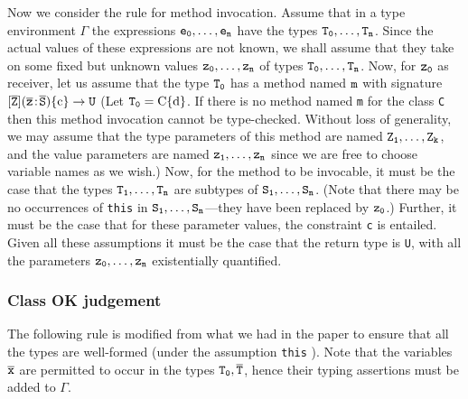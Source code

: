 \documentclass[preprint,nocopyrightspace,9pt]{sigplanconf}
\begin{document}
Now we consider the rule for method invocation. Assume that in a type
environment $\Gamma$ the expressions ${\tt e_0}, \dots, {\tt e_n}$
have the types ${\tt T_0}, \dots, {\tt T_n}$.
Since the
actual values of these expressions are not known, we shall assume that
they take on some fixed but unknown values
                                     ${\tt z_0}, \dots, {\tt z_n}$
of types ${\tt T_0}, \dots, {\tt T_n}$.
Now, for ${\tt z_0}$ as receiver, let us assume that the type
${\tt T_0}$ has a method named ${\tt m}$
with signature
$[\bar{\tt Z}](\bar{\tt z} \ty \bar{\tt S})\Xcd{\{c\}} \to {\tt U}$
(Let ${\tt T_0} = \Xcd{C\{d\}}$.
 If there is no
method named {\tt m} for the class {\tt C} then this method invocation cannot be
type-checked. Without loss of generality, we may assume that the
type parameters of this method are named
                                     ${\tt Z_1}, \dots, {\tt Z_k}$, and
the value parameters are named
                                     ${\tt z_1}, \dots, {\tt z_n}$
since we are free to choose
variable names as we wish.)
Now, for the method to be invocable,
it must be the case that the types
    ${\tt T_1}, \dots, {\tt T_n}$
are subtypes of
    ${\tt S_1}, \dots, {\tt S_n}$.
(Note
that there may be no occurrences of {\tt this} in
    ${\tt S_1}, \dots, {\tt S_n}$---they have been
replaced by ${\tt z_0}$.)
Further, it must be the case that for these parameter
values, the constraint {\tt c} is entailed. Given all these assumptions it
must be the case that the return type is {\tt U}, with all the parameters
    ${\tt z_0}, \dots, {\tt z_n}$
existentially quantified.


\subsubsection{
        Class OK judgement
}

The following rule is modified from what we had in the paper to ensure
that all the types are well-formed (under the assumption {\tt this} ).
Note
that the variables $\bar{\tt x}$ are permitted to occur in the types ${\tt T_0}, \bar{\tt T}$,
hence their typing assertions must be added to $\Gamma$.

\end{document}
